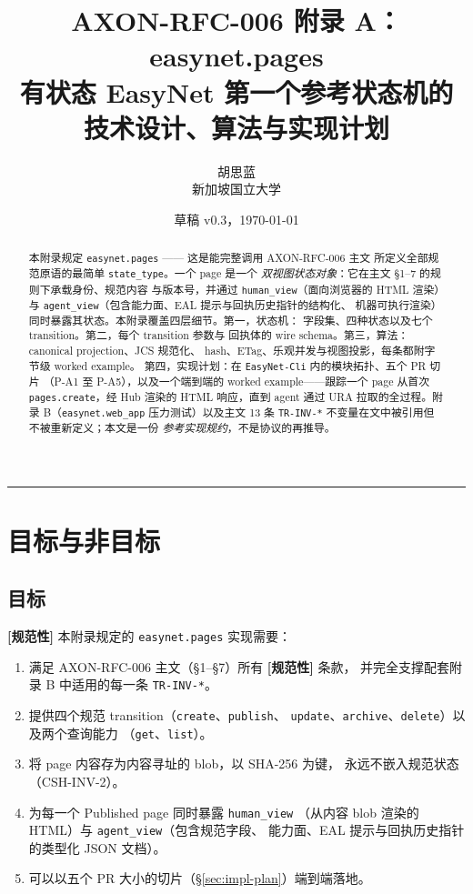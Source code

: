\documentclass[11pt,a4paper]{article}
\title{
    \vspace{-2em}
    \textbf{\Large AXON-RFC-006 附录 A：easynet.pages}\\[0.3em]
    \large 有状态 EasyNet 第一个参考状态机的技术设计、算法与实现计划
}
\author{
    胡思蓝 \\ \small 新加坡国立大学
}
\date{草稿 v0.3，\today}
\newcommand{\normsv}{\textcolor{normativecolor}{\textbf{[规范性]}}\xspace}
\theoremstyle{definition}
\begin{document}
\maketitle

\begin{abstract}
\noindent
本附录规定 \texttt{easynet.pages} —— 这是能完整调用 AXON-RFC-006 主文
所定义全部规范原语的最简单 \texttt{state\_type}。一个 page 是一个
\emph{双视图状态对象}：它在主文 \S1--7 的规则下承载身份、规范内容
与版本号，并通过 \texttt{human\_view}（面向浏览器的 HTML 渲染）与
\texttt{agent\_view}（包含能力面、EAL 提示与回执历史指针的结构化、
机器可执行渲染）同时暴露其状态。本附录覆盖四层细节。第一，状态机：
字段集、四种状态以及七个 transition。第二，每个 transition 参数与
回执体的 wire schema。第三，算法：canonical projection、JCS 规范化、
hash、ETag、乐观并发与视图投影，每条都附字节级 worked example。
第四，实现计划：在 \texttt{EasyNet-Cli} 内的模块拓扑、五个 PR 切片
（P-A1 至 P-A5），以及一个端到端的 worked example——跟踪一个 page
从首次 \texttt{pages.create}，经 Hub 渲染的 HTML 响应，直到 agent 通过
URA 拉取的全过程。附录 B（\texttt{easynet.web\_app} 压力测试）以及主文
13 条 \texttt{TR-INV-*} 不变量在文中被引用但不被重新定义；本文是一份
\emph{参考实现规约}，不是协议的再推导。
\end{abstract}

\tableofcontents
\vspace{1em}
\hrule
\vspace{1em}

\section{目标与非目标}
\label{sec:goals}

\subsection{目标}

\normsv{} 本附录规定的 \texttt{easynet.pages} 实现需要：

\begin{enumerate}[leftmargin=2.2em,itemsep=0.25em]
    \item 满足 AXON-RFC-006 主文（\S1--\S7）所有 \normsv{} 条款，
    并完全支撑配套附录 B 中适用的每一条 \texttt{TR-INV-*}。
    \item 提供四个规范 transition（\texttt{create}、\texttt{publish}、
    \texttt{update}、\texttt{archive}、\texttt{delete}）以及两个查询能力
    （\texttt{get}、\texttt{list}）。
    \item 将 page 内容存为内容寻址的 blob，以 SHA-256 为键，
    永远不嵌入规范状态（CSH-INV-2）。
    \item 为每一个 Published page 同时暴露 \texttt{human\_view}
    （从内容 blob 渲染的 HTML）与 \texttt{agent\_view}（包含规范字段、
    能力面、EAL 提示与回执历史指针的类型化 JSON 文档）。
    \item 可以以五个 PR 大小的切片（\S\ref{sec:impl-plan}）端到端落地。
\end{enumerate}
\end{document}
